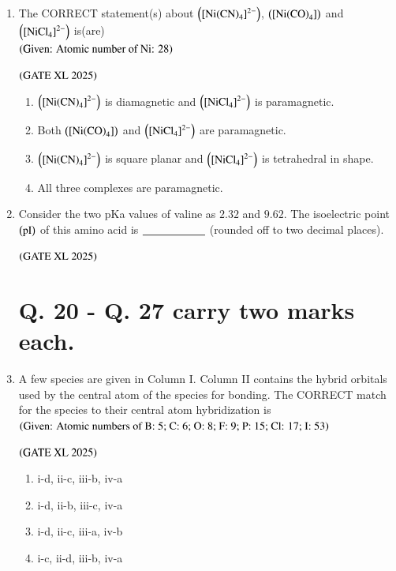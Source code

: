 \documentclass[journal]{IEEEtran}
\begin{document}
\begin{enumerate}
    \item The CORRECT statement(s) about $\left(\text{[Ni(CN)}_4\text{]}^{2-}\right)$, $\left(\text{[Ni(CO)}_4\text{]}\right)$ and $\left(\text{[NiCl}_4\text{]}^{2-}\right)$ is(are)\\
    $\left(\text{Given: Atomic number of Ni: 28}\right)$

    \hfill $\left(\text{GATE XL 2025}\right)$

    \begin{enumerate}
        \item $\left(\text{[Ni(CN)}_4\text{]}^{2-}\right)$ is diamagnetic and $\left(\text{[NiCl}_4\text{]}^{2-}\right)$ is paramagnetic.
        \item Both $\left(\text{[Ni(CO)}_4\text{]}\right)$ and $\left(\text{[NiCl}_4\text{]}^{2-}\right)$ are paramagnetic.
        \item $\left(\text{[Ni(CN)}_4\text{]}^{2-}\right)$ is square planar and $\left(\text{[NiCl}_4\text{]}^{2-}\right)$ is tetrahedral in shape.
        \item All three complexes are paramagnetic.
    \end{enumerate}

    \item Consider the two pKa values of valine as $2.32$ and $9.62$. The isoelectric point $\left(\text{pI}\right)$ of this amino acid is $\underline{\rule{2cm}{0pt}}$ (rounded off to two decimal places).

    \hfill $\left(\text{GATE XL 2025}\right)$

\section*{Q. 20 - Q. 27 carry two marks each.}

    \item A few species are given in Column I. Column II contains the hybrid orbitals used by the central atom of the species for bonding. The CORRECT match for the species to their central atom hybridization is\\
    $\left(\text{Given: Atomic numbers of B: 5; C: 6; O: 8; F: 9; P: 15; Cl: 17; I: 53}\right)$

    \hfill $\left(\text{GATE XL 2025}\right)$

    \begin{enumerate}
        \item i-d, ii-c, iii-b, iv-a
        \item i-d, ii-b, iii-c, iv-a
        \item i-d, ii-c, iii-a, iv-b
        \item i-c, ii-d, iii-b, iv-a
    \end{enumerate}


\end{enumerate}
\end{document}
